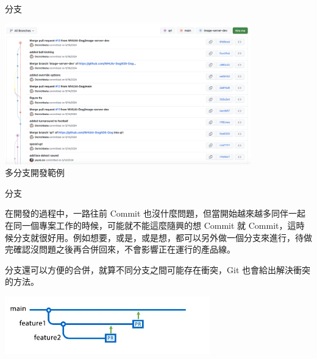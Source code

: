 \documentclass[xetex, unicode, 10pt, aspectratio=169]{beamer}
\begin{document}
\begin{frame}{分支}
    \begin{center}
        \includegraphics[width=4.2in]{./img/branches.png}\\
        多分支開發範例
    \end{center}
\end{frame}

\begin{frame}{分支}
    \begin{spacing}{1.75}
        \justifying\hspace{17pt} 在開發的過程中，⼀路往前 Commit
        也沒什麼問題，但當開始越來越多同伴⼀起在同⼀個專案⼯作的時候，可能就不能這麼隨興的想 Commit 就
        Commit，這時候分⽀就很好⽤。例如想要，或是，或是想，都可以另外做⼀個分⽀來進⾏，待做完確認沒問題之後再合併回來，不會影響正在運⾏的產品線。

        \justifying \hspace{17pt} 分支還可以方便的合併，就算不同分支之間可能存在衝突，Git 也會給出解決衝突的方法。

        \begin{center}
            \includegraphics[width=3.5in]{./img/github-branches.png}
        \end{center}
    \end{spacing}
\end{frame}
\end{document}
